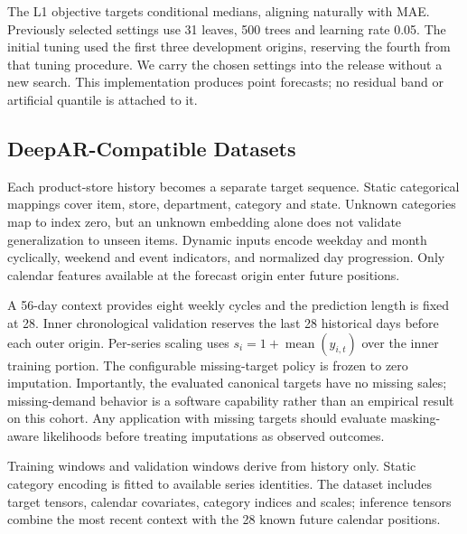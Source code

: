 \documentclass[conference]{IEEEtran}
\begin{document}
The L1 objective targets conditional medians, aligning naturally with MAE. Previously selected settings use 31 leaves, 500 trees and learning rate 0.05. The initial tuning used the first three development origins, reserving the fourth from that tuning procedure. We carry the chosen settings into the release without a new search. This implementation produces point forecasts; no residual band or artificial quantile is attached to it.

\subsection{DeepAR-Compatible Datasets}
Each product-store history becomes a separate target sequence. Static categorical mappings cover item, store, department, category and state. Unknown categories map to index zero, but an unknown embedding alone does not validate generalization to unseen items. Dynamic inputs encode weekday and month cyclically, weekend and event indicators, and normalized day progression. Only calendar features available at the forecast origin enter future positions.

A 56-day context provides eight weekly cycles and the prediction length is fixed at 28. Inner chronological validation reserves the last 28 historical days before each outer origin. Per-series scaling uses $s_i=1+\operatorname{mean}(y_{i,t})$ over the inner training portion. The configurable missing-target policy is frozen to zero imputation. Importantly, the evaluated canonical targets have no missing sales; missing-demand behavior is a software capability rather than an empirical result on this cohort. Any application with missing targets should evaluate masking-aware likelihoods before treating imputations as observed outcomes.

Training windows and validation windows derive from history only. Static category encoding is fitted to available series identities. The dataset includes target tensors, calendar covariates, category indices and scales; inference tensors combine the most recent context with the 28 known future calendar positions.
\end{document}
